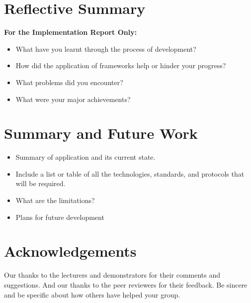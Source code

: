\documentclass{sig-alt-release2}
\begin{document}
\section{Reflective Summary}
{\bf For the Implementation Report Only:}
\begin{itemize}
\item	What have you learnt through the process of development? 
\item	How did the application of frameworks help or hinder your progress? 
\item	What problems did you encounter? 
\item	What were your major achievements?
\end{itemize}

\section{Summary and Future Work}
\begin{itemize}
\item	Summary of application and its current state.
\item	Include a list or table of all the technologies, standards, and protocols that will be required.
\item	What are the limitations?
\item Plans for future development
\end{itemize}

\section{Acknowledgements}
Our thanks to the lecturers and demonstrators for their comments and suggestions. And our thanks to the peer reviewers for their feedback.
Be sincere and be specific about how others have helped your group.



\end{document}
